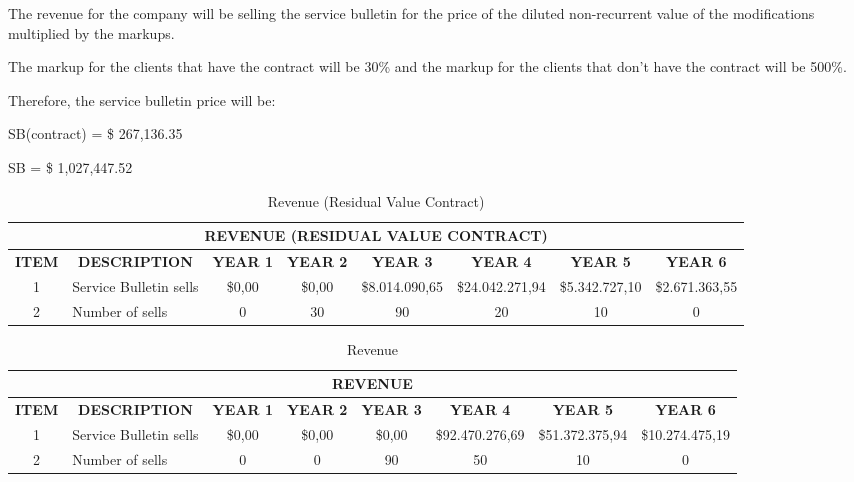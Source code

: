The revenue for the company will be selling the service bulletin for the price of the diluted non-recurrent value of the modifications multiplied by the markups.

The markup for the clients that have the contract will be 30\% and the markup for the clients that don't have the contract will be 500\%.

Therefore, the service bulletin price will be:

SB(contract) = \$ 267,136.35

SB = \$ 1,027,447.52


\begin{table}[H]
  \scriptsize
  \centering
  \caption{Revenue (Residual Value Contract)}
    \begin{tabular}{crcccccc}
    \toprule
    \multicolumn{8}{c}{\textbf{REVENUE (RESIDUAL VALUE CONTRACT)}} \\
    \midrule
    \textbf{ITEM} & \multicolumn{1}{c}{\textbf{DESCRIPTION}} & \textbf{YEAR 1} & \textbf{YEAR 2} & \textbf{YEAR 3} & \textbf{YEAR 4} & \textbf{YEAR 5} & \textbf{YEAR 6} \\
    1     & \multicolumn{1}{l}{Service Bulletin sells} & \$0,00 & \$0,00 & \$8.014.090,65 & \$24.042.271,94 & \$5.342.727,10 & \$2.671.363,55 \\
    2     & \multicolumn{1}{l}{Number of sells} & 0     & 30    & 90    & 20    & 10    & 0 \\
    \bottomrule
    \end{tabular}%
  \label{tab:financeResidualRevenue1}%
\end{table}%


\begin{table}[H]
  \scriptsize
  \centering
  \caption{Revenue}
    \begin{tabular}{crcccccc}
    \toprule
    \multicolumn{8}{c}{\textbf{REVENUE}} \\
    \midrule
    \textbf{ITEM} & \multicolumn{1}{c}{\textbf{DESCRIPTION}} & \textbf{YEAR 1} & \textbf{YEAR 2} & \textbf{YEAR 3} & \textbf{YEAR 4} & \textbf{YEAR 5} & \textbf{YEAR 6} \\
    1     & \multicolumn{1}{l}{Service Bulletin sells} & \$0,00 & \$0,00 & \$0,00 & \$92.470.276,69 & \$51.372.375,94 & \$10.274.475,19 \\
    2     & \multicolumn{1}{l}{Number of sells} & 0     & 0     & 90    & 50    & 10    & 0 \\
    \bottomrule
    \end{tabular}%
  \label{tab:revenue2}%
\end{table}%

